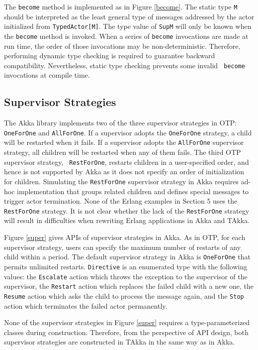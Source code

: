 The {\tt become} method is implemented as in Figure \ref{become}.  The
static type {\tt M} should be interpreted as the least general type of
messages addressed by the actor initialized from {\tt TypedActor[M]}.  The
type value of {\tt SupM} will only be known when the {\tt become} method 
is invoked.  When a series of {\tt become} invocations are made at run 
time, the order of those invocations may be non-deterministic.  Therefore, 
performing dynamic type checking is required to guarantee backward
compatibility.  Nevertheless, static type checking prevents some invalid {\tt 
become} invocations at compile time.

\subsection{Supervisor Strategies}
\label{supervision}

The Akka library implements two of the three supervisor strategies in OTP:
{\tt OneForOne} and {\tt AllForOne}.  If a supervisor adopts the
{\tt OneForOne} strategy, a child will be restarted when it fails.  If a 
supervisor adopts the {\tt AllForOne} supervisor strategy, all children will 
be restarted when any of them fails.  The third OTP supervisor strategy, {\tt
RestForOne}, restarts children in a user-specified order, and hence is not
supported by Akka as it does not specify an order of initialization for
children.  Simulating the {\tt RestForOne} supervisor strategy in Akka
requires ad-hoc implementation that groups related children and defines special
messages to trigger actor termination.  None of the Erlang examples in Section 5
uses the {\tt RestForOne} strategy.  It is not clear whether the lack of
the {\tt RestForOne} strategy will result in difficulties when rewriting Erlang
applications in Akka and TAkka.

Figure \ref{super} gives APIs of supervisor strategies in Akka.  As in OTP, for
each supervisor strategy, users can specify the maximum number of
restarts of any child within a period.  The default 
supervisor strategy in Akka is {\tt OneForOne} that permits unlimited 
restarts.  {\tt Directive} is an enumerated type with the following values: the
{\tt Escalate} action which throws the exception to the supervisor of the 
supervisor, the {\tt Restart} action which replaces the failed child with a new 
one, the {\tt Resume} action which asks the child to process the message again, 
and the {\tt Stop} action which terminates the failed actor permanently.

None of the supervisor strategies in Figure \ref{super} requires a 
type-parameterized classes during construction.  Therefore, from the perspective 
of API design, both supervisor strategies are constructed in TAkka in the same 
way as in Akka.


